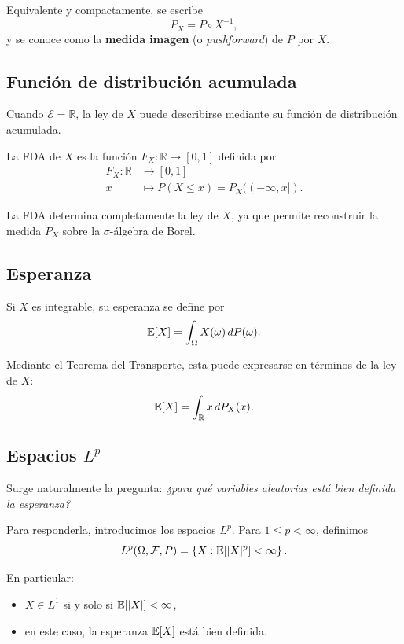 Equivalente y compactamente, se escribe
\[
P_X = P \circ X^{-1},
\]
y se conoce como la \textbf{medida imagen} (o \textit{pushforward}) de $P$ por $X$.

\subsection{Función de distribución acumulada}

Cuando $\mathcal{E} = \mathbb{R}$, la ley de $X$ puede describirse mediante su función de distribución acumulada.

\begin{defi}
La FDA de $X$ es la función $F_X:\mathbb{R} \to [0,1]$ definida por
\[
\begin{aligned}
F_X : \mathbb{R} &\to [0,1] \\
x &\mapsto P(X \leq x) = P_X((-\infty, x]).
\end{aligned}
\]
\end{defi}

La FDA determina completamente la ley de $X$, ya que permite reconstruir la medida $P_X$ sobre la $\sigma$-álgebra de Borel.

\subsection{Esperanza}

\begin{defi}[Esperanza]
Si $X$ es integrable, su esperanza se define por
\[
\mathbb{E}[X] = \int_{\Omega} X(\omega) \, dP(\omega).
\]
\end{defi}

Mediante el Teorema del Transporte, esta puede expresarse en términos de la ley de $X$:
\[
\mathbb{E}[X] = \int_{\mathbb{R}} x \, dP_X(x).
\]

\subsection{Espacios \texorpdfstring{$L^p$}{Lp}}

Surge naturalmente la pregunta: \textit{¿para qué variables aleatorias está bien definida la esperanza?}

Para responderla, introducimos los espacios $L^p$. Para $1 \leq p < \infty$, definimos
\[
L^p(\Omega,\mathcal{F},P)
= \left\{ X : \mathbb{E}[|X|^p] < \infty \right\}.
\]

En particular:
\begin{itemize}
\item $X \in L^1$ si y solo si $\mathbb{E}[|X|] < \infty$,
\item en este caso, la esperanza $\mathbb{E}[X]$ está bien definida.
\end{itemize}

